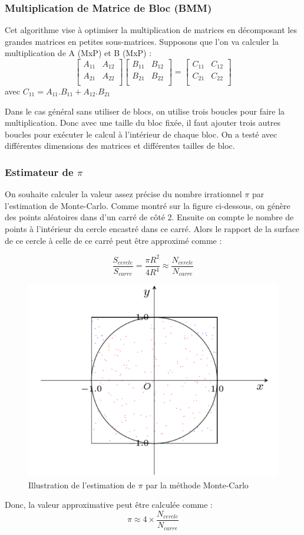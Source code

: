 \documentclass[12pt,a4paper]{article}
\begin{document}
\subsubsection{Multiplication de Matrice de Bloc (BMM)}
Cet algorithme vise à optimiser la multiplication de matrices en décomposant les grandes matrices en petites sous-matrices. Supposons que l’on va calculer la multiplication de A (MxP) et B (MxP) :
$$
\begin{bmatrix}
A_{11} & A_{12}\\
A_{21} & A_{22}\\
\end{bmatrix}
\begin{bmatrix}
B_{11} & B_{12}\\
B_{21} & B_{22}\\
\end{bmatrix}
=
\begin{bmatrix}
C_{11} & C_{12}\\
C_{21} & C_{22}\\
\end{bmatrix}
$$
avec $ C_{11} = A_{11}.B_{11} + A_{12}.B_{21}$

Dans le cas général sans utiliser de blocs, on utilise trois boucles pour faire la multiplication. Donc avec une taille du bloc fixée, il faut ajouter trois autres boucles pour exécuter le calcul à l’intérieur de chaque bloc. On a testé avec différentes dimensions des matrices et différentes tailles de bloc. 

\subsubsection{Estimateur de $\pi$}
On souhaite calculer la valeur assez précise du nombre irrationnel $\pi$ par l'estimation de Monte-Carlo. Comme montré sur la figure ci-dessous, on génère des points aléatoires dans d’un carré de côté 2. Ensuite on compte le nombre de points à l’intérieur du cercle encastré dans ce carré. Alors le rapport de la surface de ce cercle à celle de ce carré peut être approximé comme :

$$ \dfrac{S_{cercle}}{S_{carre}} = \dfrac{\pi R^2}{4R^4} \approx \dfrac{N_{cercle}}{N_{carre}}$$
\begin{figure}[H]
	\centering
	\includegraphics[width=0.5\linewidth]{soft/screenshot002}
	\caption{Illustration de l'estimation de $\pi$ par la méthode Monte-Carlo}
	\label{fig:screenshot002}
\end{figure}
Donc, la valeur approximative peut être calculée comme :
$$ \pi \approx 4 \times \dfrac{N_{cercle}}{N_{carre}}$$
\end{document}
